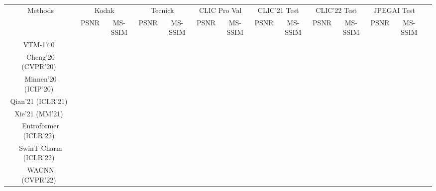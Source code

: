 \documentclass[sigconf]{acmart}
\begin{document}
\begin{table*}[t]
  \footnotesize
  \centering
  \begin{tabular}{@{}cccccccccccccc@{}}
  \toprule
  \multicolumn{1}{c|}{\multirow{2}{*}{Methods}}                            & \multicolumn{2}{c}{Kodak~\cite{kodak}}       & \multicolumn{2}{c}{Tecnick~\cite{asuni2014testimages}}   & \multicolumn{2}{c}{CLIC Pro Val~\cite{clic2020dataset}} & \multicolumn{2}{c}{CLIC'21 Test~\cite{clic2021dataset}} & \multicolumn{2}{c}{CLIC'22 Test~\cite{clic2022dataset}}  & \multicolumn{2}{c}{JPEGAI Test~\cite{jpegai}}   \\
  \multicolumn{1}{c|}{}                                                     & \multicolumn{1}{c}{PSNR} & \multicolumn{1}{c}{MS-SSIM} & \multicolumn{1}{c}{PSNR}& \multicolumn{1}{c}{MS-SSIM} & \multicolumn{1}{c}{PSNR}& \multicolumn{1}{c}{MS-SSIM}& \multicolumn{1}{c}{PSNR}& \multicolumn{1}{c}{MS-SSIM} & \multicolumn{1}{c}{PSNR}& \multicolumn{1}{c}{MS-SSIM} & \multicolumn{1}{c}{PSNR}& \multicolumn{1}{c}{MS-SSIM}\\ \midrule
  \multicolumn{1}{c|}{VTM-17.0~\cite{vtm2019}}                                        &        &          &          &   &     &     &     &   &     &    &    & \\\midrule
  \multicolumn{1}{c|}{Cheng'20 (CVPR'20)~\cite{DBLP:conf/cvpr/ChengSTK20}}            &       &        &        &  &  &  &  &  &  &  &  &  \\\midrule
  \multicolumn{1}{c|}{Minnen'20 (ICIP'20)~\cite{DBLP:conf/icip/MinnenS20}}            &       &             &         &      &   &   &   &   &   &   &   &  \\\midrule
  \multicolumn{1}{c|}{Qian'21 (ICLR'21)~\cite{DBLP:conf/iclr/QianTSLLSHJ21}}          &       &        &        &   &        &  &        &  &        &   &   &   \\\midrule
  \multicolumn{1}{c|}{Xie'21 (MM'21)~\cite{DBLP:conf/mm/XieCC21}}                     &       &        &        &  & &  &   &  &  &   &  & \\\midrule
  \multicolumn{1}{c|}{Entroformer (ICLR'22)~\cite{DBLP:journals/corr/abs-2202-05492}} &       &        &               &      &  &  &  &  &   &  &  &  \\\midrule
  \multicolumn{1}{c|}{SwinT-Charm (ICLR'22)~\cite{zhu2021transformer}}                &       &        &      &  &   &  &   & & & &  &   \\\midrule
  \multicolumn{1}{c|}{WACNN (CVPR'22)~\cite{DBLP:journals/corr/abs-2203-08450}}       &       &        &         &   &  &  &  &  &  &   &  & \\\midrule

\end{tabular}
\end{table*}
\end{document}
